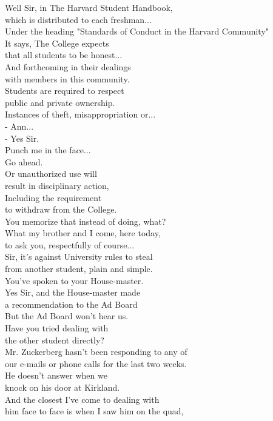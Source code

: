 \documentclass{article}
\begin{document}
\begin{multicols}{3}
Well Sir, in The Harvard Student Handbook,\\
which is distributed to each freshman...\\
Under the heading "Standards of Conduct in the Harvard Community"\\
It says, The College expects\\
that all students to be honest...\\
And forthcoming in their dealings\\
with members in this community.\\
Students are required to respect\\
public and private ownership.\\
Instances of theft, misappropriation or...\\
- Ann...\\
- Yes Sir.\\
Punch me in the face...\\
Go ahead.\\
Or unauthorized use will\\
result in disciplinary action,\\
Including the requirement\\
to withdraw from the College.\\
You memorize that instead of doing, what?\\
What my brother and I come, here today,\\
to ask you, respectfully of course...\\
Sir, it's against University rules to steal\\
from another student, plain and simple.\\
You've spoken to your House-master.\\
Yes Sir, and the House-master made\\
a recommendation to the Ad Board\\
But the Ad Board won't hear us.\\
Have you tried dealing with\\
the other student directly?\\
Mr. Zuckerberg hasn't been responding to any of\\
our e-mails or phone calls for the last two weeks.\\
He doesn't answer when we\\
knock on his door at Kirkland.\\
And the closest I've come to dealing with\\
him face to face is when I saw him on the quad,\\

\end{multicols}
\end{document}
